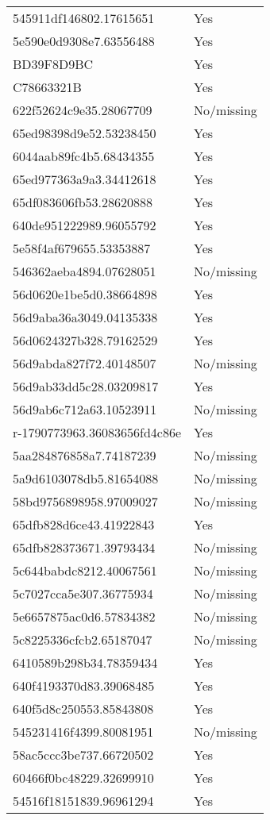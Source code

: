 \begin{tabular}{ll}
545911df146802.17615651 & Yes \\
5e590e0d9308e7.63556488 & Yes \\
BD39F8D9BC & Yes \\
C78663321B & Yes \\
622f52624c9e35.28067709 & No/missing \\
65ed98398d9e52.53238450 & Yes \\
6044aab89fc4b5.68434355 & Yes \\
65ed977363a9a3.34412618 & Yes \\
65df083606fb53.28620888 & Yes \\
640de951222989.96055792 & Yes \\
5e58f4af679655.53353887 & Yes \\
546362aeba4894.07628051 & No/missing \\
56d0620e1be5d0.38664898 & Yes \\
56d9aba36a3049.04135338 & Yes \\
56d0624327b328.79162529 & Yes \\
56d9abda827f72.40148507 & No/missing \\
56d9ab33dd5c28.03209817 & Yes \\
56d9ab6c712a63.10523911 & No/missing \\
r-1790773963.36083656fd4c86e & Yes \\
5aa284876858a7.74187239 & No/missing \\
5a9d6103078db5.81654088 & No/missing \\
58bd9756898958.97009027 & No/missing \\
65dfb828d6ce43.41922843 & Yes \\
65dfb828373671.39793434 & No/missing \\
5c644babdc8212.40067561 & No/missing \\
5c7027cca5e307.36775934 & No/missing \\
5e6657875ac0d6.57834382 & No/missing \\
5c8225336cfcb2.65187047 & No/missing \\
6410589b298b34.78359434 & Yes \\
640f4193370d83.39068485 & Yes \\
640f5d8c250553.85843808 & Yes \\
545231416f4399.80081951 & No/missing \\
58ac5ccc3be737.66720502 & Yes \\
60466f0bc48229.32699910 & Yes \\
54516f18151839.96961294 & Yes \\

\end{tabular}
